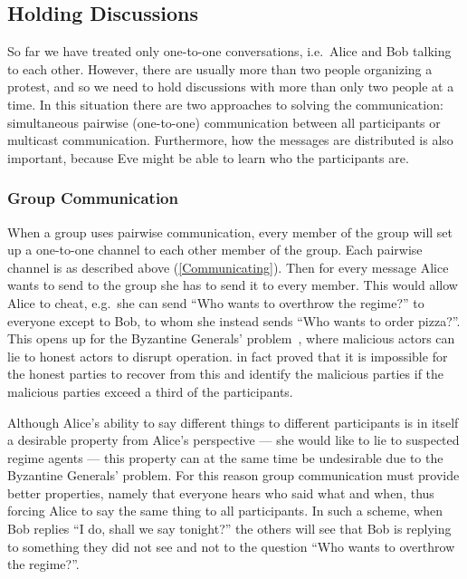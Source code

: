 \subsection{Holding Discussions}
\label{Discussions}

So far we have treated only one-to-one conversations, i.e.\ Alice and Bob 
talking to each other.
However, there are usually more than two people organizing a protest, and so we 
need to hold discussions with more than only two people at a time.
In this situation there are two approaches to solving the communication:
simultaneous pairwise (one-to-one) communication between all participants or 
multicast communication.
Furthermore, how the messages are distributed is also important, because Eve 
might be able to learn who the participants are.

\subsubsection{Group Communication}
\label{GroupCommunication}

When a group uses pairwise communication, every member of the group will set up 
a one-to-one channel to each other member of the group.
Each pairwise channel is as described above (\cref{Communicating}).
Then for every message Alice wants to send to the group she has to send it to 
every member.
This would allow Alice to cheat, e.g.\ she can send \enquote{Who wants to 
  overthrow the regime?} to everyone except to Bob, to whom she instead sends 
\enquote{Who wants to order pizza?}.
This opens up for the Byzantine Generals' problem~\cite{ByzantineGenerals}, 
where malicious actors can lie to honest actors to disrupt operation.
\textcite{ByzantineGenerals} in fact proved that it is impossible for the 
honest parties to recover from this and identify the malicious parties if the 
malicious parties exceed a third of the participants.
  
Although Alice's ability to say different things to different participants is 
in itself a desirable property from Alice's perspective --- she would like to 
lie to suspected regime agents --- this property can at the same time be 
undesirable due to the Byzantine Generals' problem.
For this reason group communication must provide better properties, namely that 
everyone hears who said what and when, thus forcing Alice to say the same thing 
to all participants.
In such a scheme, when Bob replies \enquote{I do, shall we say tonight?} the 
others will see that Bob is replying to something they did not see and not to 
the question \enquote{Who wants to overthrow the regime?}.

